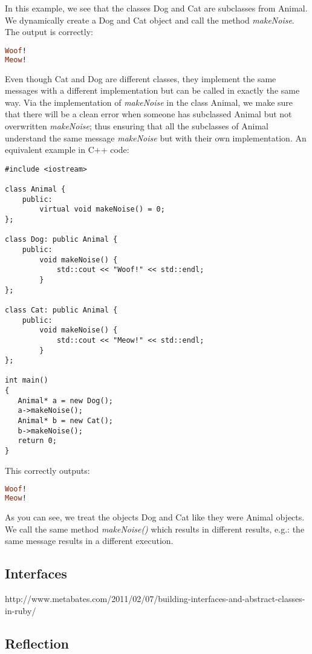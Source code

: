 \documentclass[10pt,a4paper,twocolumn]{article}
\begin{document}
In this example, we see that the classes Dog and Cat are subclasses from Animal. We dynamically create a Dog and Cat object and call the method \textit{makeNoise}. The output is correctly:

\begin{lstlisting}[language=Ruby]
Woof!
Meow!
\end{lstlisting}

Even though Cat and Dog are different classes, they implement the same messages with a different implementation but can be called in exactly the same way. Via the implementation of \textit{makeNoise} in the class Animal, we make sure that there will be a clean error when someone has subclassed Animal but not overwritten \textit{makeNoise}; thus ensuring that all the subclasses of Animal understand the same message \textit{makeNoise} but with their own implementation. An equivalent example in C++ code:

\begin{lstlisting}
#include <iostream>

class Animal {
	public:
		virtual void makeNoise() = 0;
};

class Dog: public Animal {
	public:
		void makeNoise() {
			std::cout << "Woof!" << std::endl;
		}
};

class Cat: public Animal {
	public:
		void makeNoise() {
			std::cout << "Meow!" << std::endl;
		}
};
 
int main()
{
   Animal* a = new Dog();
   a->makeNoise();
   Animal* b = new Cat();
   b->makeNoise();
   return 0;
}
\end{lstlisting}

This correctly outputs: 

\begin{lstlisting}[language=Ruby]
Woof!
Meow!
\end{lstlisting}

As you can see, we treat the objects Dog and Cat like they were Animal objects. We call the same method \textit{makeNoise()} which results in different results, e.g.: the same message results in a different execution.

\subsection{Interfaces}

http://www.metabates.com/2011/02/07/building-interfaces-and-abstract-classes-in-ruby/

\subsection{Reflection}
\end{document}
